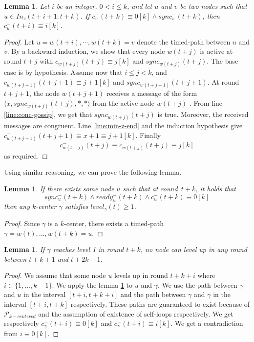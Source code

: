\documentclass[11pt,letterpaper]{article}
\newtheorem{lem}[thm]{Lemma}
\newcommand{\cent}{\gamma}
\begin{document}
\begin{lem} \label{lem:conc-safety}
	Let $i$ be an integer, $0 < i \leq k$, and let  $u$ and $v$ be two nodes such that  $u\in In_v( t+i +1 : t+k)$.
	If $c^-_v(t+k) \equiv 0 [k] \wedge sync^-_v(t+k)$, then $c_u^-(t+i) \equiv i [k]$.
\end{lem}
\begin{proof}
	Let $u = w(t+i), \cdots, w(t+k) = v$ denote the timed-path between $u$ and $v$.
	By a backward induction,  we show  that every node $w(t+j)$  is active at round $ t + j $
	with $c_{w(t+j)}^-(t+j) \equiv j [k]$ and $sync_{w(t+j)}^-(t+j)$.
	The base case is by hypothesis.
	Assume now that $i \leq j < k$, and $c_{w(t+j+1)}^-(t+j+1) \equiv j+1 [k]$ and $sync_{w(t+j+1)}^-(t+j+1)$.
	At round $t+j+1$,  the node $w(t+j+1)$ receives a message of the form $\langle x, sync_{w(t+j)}(t+j), *, * \rangle$ %
	from the active node $w(t+j)$ .
	From line \ref{line:conc-gossip}, we get that  $sync_{w(t+j)}(t+j)$ is true. 
	Moreover, the received messages are congruent. %
	Line \ref{line:min-z-end} and the induction hypothesis give $c_{w(t+j+1)}^-(t+j+1) \equiv x+1 \equiv j+1 [k]$.
	Finally  %
	$$c_{w(t+j)}^-(t+j) \equiv c_{w(t+j)}(t+j) \equiv j [k] $$
	as required.
\end{proof}

\noindent Using similar reasoning, we can prove the following lemma.
\begin{lem} \label{lem:conc-safety-bis}
If there exists some node $u$ such that at round~$t+k$, it holds that 
	$$sync_u^-(t+k) \wedge ready_u^-(t+k) \wedge c_u^-(t+k) \equiv 0 [k] $$ 
	then any $k$-center $\gamma$ satisfies $level_\cent(t) \geq 1$.
\end{lem}
\begin{proof}
Since $\gamma$ is a $k$-center,  there exists a timed-path $\cent = w(t), \dots, w(t+k) = u$. 
\end{proof}

\begin{lem} \label{lem:no-close-level2}
	If $\cent$ reaches level 1 in round $t+k$, no node can level up in any round between $t+k+1$ and $t+2k-1$.
\end{lem}
\begin{proof}
	We assume that some node $u$ levels up in round $t+k+i$ where $i \in \{1, \dots, k-1\}$.
	We apply the lemma \ref{lem:conc-safety} to $u$ and $\cent$.
	We use the path between $\cent$ and $u$ in the interval $[t+i,t+k+i]$ and the path between $\cent$ and $\cent$ in the interval $[t+i,t+k]$ respectively.
	These paths are guaranteed to exist because of $\mathcal{P}_{k-centered}$ and the assumption of existence of self-loops respectively.
	We get respectively $c_\cent^-(t+i) \equiv 0 [k]$ and $c_\cent^-(t+i) \equiv i [k]$.
	We get a contradiction from $i \equiv 0 [k]$.
\end{proof}
\end{document}
